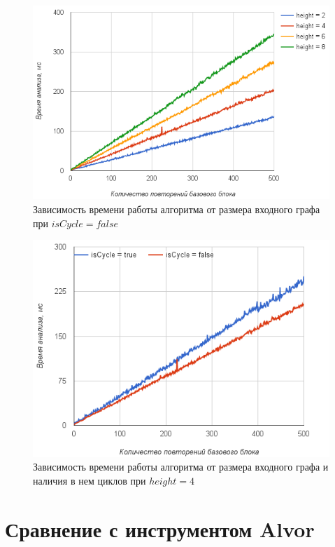 \begin{figure}[h!]
 \centering
 \includegraphics[width=15cm]{pics/diffheights.png}
 \caption{Зависимость времени работы алгоритма от размера входного графа при $isCycle=false$}
 \label{diffheights}
\end{figure}

\begin{figure}[h!]
 \centering
 \includegraphics[width=15cm]{pics/heigh4.png}
 \caption{Зависимость времени работы алгоритма от размера входного графа и наличия в нем циклов при $height=4$}
 \label{CycleVsLinear}
\end{figure}


\section{Сравнение с инструментом Alvor}

